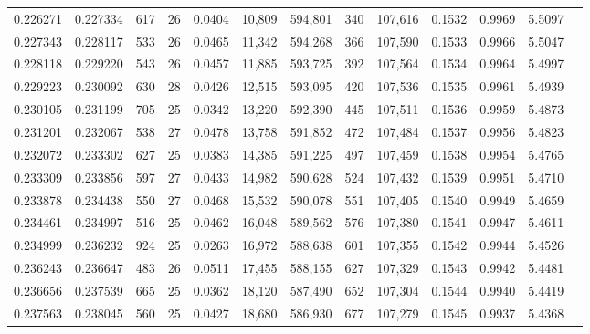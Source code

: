 \begin{tabular}{rrrrrrrrrrrrr}
0.226271 & 0.227334 &   617 &  26 &                                     0.0404 &  10,809 & 594,801 &     340 & 107,616 & 0.1532 & 0.9969 & 5.5097 \\
0.227343 & 0.228117 &   533 &  26 &                                     0.0465 &  11,342 & 594,268 &     366 & 107,590 & 0.1533 & 0.9966 & 5.5047 \\
0.228118 & 0.229220 &   543 &  26 &                                     0.0457 &  11,885 & 593,725 &     392 & 107,564 & 0.1534 & 0.9964 & 5.4997 \\
0.229223 & 0.230092 &   630 &  28 &                                     0.0426 &  12,515 & 593,095 &     420 & 107,536 & 0.1535 & 0.9961 & 5.4939 \\
0.230105 & 0.231199 &   705 &  25 &                                     0.0342 &  13,220 & 592,390 &     445 & 107,511 & 0.1536 & 0.9959 & 5.4873 \\
0.231201 & 0.232067 &   538 &  27 &                                     0.0478 &  13,758 & 591,852 &     472 & 107,484 & 0.1537 & 0.9956 & 5.4823 \\
0.232072 & 0.233302 &   627 &  25 &                                     0.0383 &  14,385 & 591,225 &     497 & 107,459 & 0.1538 & 0.9954 & 5.4765 \\
0.233309 & 0.233856 &   597 &  27 &                                     0.0433 &  14,982 & 590,628 &     524 & 107,432 & 0.1539 & 0.9951 & 5.4710 \\
0.233878 & 0.234438 &   550 &  27 &                                     0.0468 &  15,532 & 590,078 &     551 & 107,405 & 0.1540 & 0.9949 & 5.4659 \\
0.234461 & 0.234997 &   516 &  25 &                                     0.0462 &  16,048 & 589,562 &     576 & 107,380 & 0.1541 & 0.9947 & 5.4611 \\
0.234999 & 0.236232 &   924 &  25 &                                     0.0263 &  16,972 & 588,638 &     601 & 107,355 & 0.1542 & 0.9944 & 5.4526 \\
0.236243 & 0.236647 &   483 &  26 &                                     0.0511 &  17,455 & 588,155 &     627 & 107,329 & 0.1543 & 0.9942 & 5.4481 \\
0.236656 & 0.237539 &   665 &  25 &                                     0.0362 &  18,120 & 587,490 &     652 & 107,304 & 0.1544 & 0.9940 & 5.4419 \\
0.237563 & 0.238045 &   560 &  25 &                                     0.0427 &  18,680 & 586,930 &     677 & 107,279 & 0.1545 & 0.9937 & 5.4368 \\

\end{tabular}

